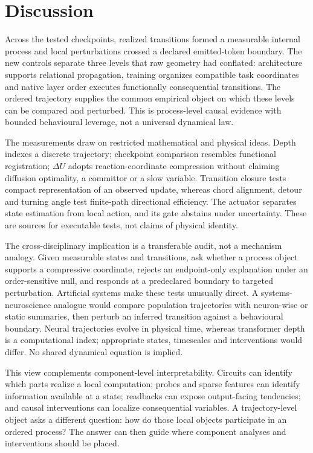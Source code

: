 \documentclass[11pt]{article}
\begin{document}
\section{Discussion}
Across the tested checkpoints, realized transitions formed a measurable internal process and local perturbations crossed a declared emitted-token boundary. The new controls separate three levels that raw geometry had conflated: architecture supports relational propagation, training organizes compatible task coordinates and native layer order executes functionally consequential transitions. The ordered trajectory supplies the common empirical object on which these levels can be compared and perturbed. This is process-level causal evidence with bounded behavioural leverage, not a universal dynamical law.

The measurements draw on restricted mathematical and physical ideas. Depth indexes a discrete trajectory; checkpoint comparison resembles functional registration; $\Delta U$ adopts reaction-coordinate compression without claiming diffusion optimality, a committor or a slow variable. Transition closure tests compact representation of an observed update, whereas chord alignment, detour and turning angle test finite-path directional efficiency. The actuator separates state estimation from local action, and its gate abstains under uncertainty. These are sources for executable tests, not claims of physical identity.

The cross-disciplinary implication is a transferable audit, not a mechanism analogy. Given measurable states and transitions, ask whether a process object supports a compressive coordinate, rejects an endpoint-only explanation under an order-sensitive null, and responds at a predeclared boundary to targeted perturbation. Artificial systems make these tests unusually direct. A systems-neuroscience analogue would compare population trajectories with neuron-wise or static summaries, then perturb an inferred transition against a behavioural boundary. Neural trajectories evolve in physical time, whereas transformer depth is a computational index; appropriate states, timescales and interventions would differ. No shared dynamical equation is implied.

This view complements component-level interpretability. Circuits can identify which parts realize a local computation; probes and sparse features can identify information available at a state; readbacks can expose output-facing tendencies; and causal interventions can localize consequential variables. A trajectory-level object asks a different question: how do those local objects participate in an ordered process? The answer can then guide where component analyses and interventions should be placed.
\end{document}
